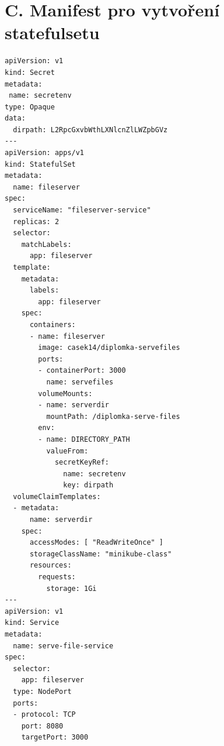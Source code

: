 \section*{C. Manifest pro vytvoření statefulsetu\label{app:statefulset}}
\begin{verbatim}
apiVersion: v1
kind: Secret
metadata:
 name: secretenv
type: Opaque
data:
  dirpath: L2RpcGxvbWthLXNlcnZlLWZpbGVz
---
apiVersion: apps/v1
kind: StatefulSet
metadata:
  name: fileserver
spec:
  serviceName: "fileserver-service"
  replicas: 2
  selector:
    matchLabels:
      app: fileserver
  template:
    metadata:
      labels:
        app: fileserver
    spec:
      containers:
      - name: fileserver
        image: casek14/diplomka-servefiles
        ports:
        - containerPort: 3000
          name: servefiles
        volumeMounts:
        - name: serverdir
          mountPath: /diplomka-serve-files
        env:
        - name: DIRECTORY_PATH
          valueFrom:
            secretKeyRef:
              name: secretenv
              key: dirpath
  volumeClaimTemplates:
  - metadata:
      name: serverdir
    spec:
      accessModes: [ "ReadWriteOnce" ]
      storageClassName: "minikube-class"
      resources:
        requests:
          storage: 1Gi
---
apiVersion: v1
kind: Service
metadata:
  name: serve-file-service
spec:
  selector:
    app: fileserver
  type: NodePort
  ports:        
  - protocol: TCP
    port: 8080
    targetPort: 3000
\end{verbatim}

\clearpage
